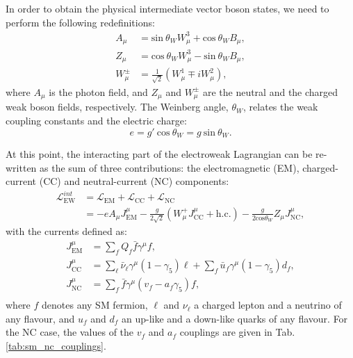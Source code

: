 In order to obtain the physical intermediate vector boson states, we need to perform the following redefinitions:
\begin{equation}
	\begin{split}
		A_{\mu} &= \mathrm{sin}~\theta_{W} W^{3}_{\mu} + \mathrm{cos}~\theta_{W} B_{\mu},\\
		Z_{\mu} &= \mathrm{cos}~\theta_{W} W^{3}_{\mu} - \mathrm{sin}~\theta_{W} B_{\mu},\\
		W^{\pm}_{\mu} &= \frac{1}{\sqrt{2}}\left(W^{1}_{\mu} \mp i W^{2}_{\mu}\right),
	\end{split}
\end{equation}
where $A_{\mu}$ is the photon field, and $Z_{\mu}$ and $W^{\pm}_{\mu}$ are the neutral and the charged weak boson fields, respectively. The Weinberg angle, $\theta_{W}$, relates the weak coupling constants and the electric charge:
\begin{equation}
	e = g'~\mathrm{cos}~\theta_{W} = g~\mathrm{sin}~\theta_{W}.
\end{equation}

At this point, the interacting part of the electroweak Lagrangian can be re-written as the sum of three contributions: the electromagnetic (EM), charged-current (CC) and neutral-current (NC) components:
\begin{equation}
	\begin{split}
		\mathcal{L}^{int}_{\mathrm{EW}} &= \mathcal{L}_{\mathrm{EM}}+\mathcal{L}_{\mathrm{CC}}+\mathcal{L}_{\mathrm{NC}}\\
		&= -e A_{\mu} J^{\mu}_{\mathrm{EM}} - \frac{g}{2\sqrt{2}} \left(W^{+}_{\mu}J^{\mu}_{\mathrm{CC}} + \mathrm{h.c.}\right) - \frac{g}{2 \mathrm{cos}\theta_{W}} Z_{\mu} J^{\mu}_{\mathrm{NC}},
	\end{split}
\end{equation}
with the currents defined as:
\begin{equation}\label{2.8}
	\begin{split}
		J^{\mu}_{\mathrm{EM}} &= \sum_{f} Q_{f} \bar{f}\gamma^{\mu}f,\\
		J^{\mu}_{\mathrm{CC}} &= \sum_{\ell}\bar{\nu}_{\ell}\gamma^{\mu}(1-\gamma_{5})\ell + \sum_{f}\bar{u}_{f}\gamma^{\mu}(1-\gamma_{5})d_{f},\\
		J^{\mu}_{\mathrm{NC}} &= \sum_{f} \bar{f}\gamma^{\mu}(v_{f} - a_{f}\gamma_{5})f,\\
	\end{split}
\end{equation}
where $f$ denotes any SM fermion, $\ell$ and $\nu_{\ell}$ a charged lepton and a neutrino of any flavour, and $u_{f}$ and $d_{f}$ an up-like and a down-like quarks of any flavour. For the NC case, the values of the $v_{f}$ and $a_{f}$ couplings are given in Tab. \ref{tab:sm_nc_couplings}.

